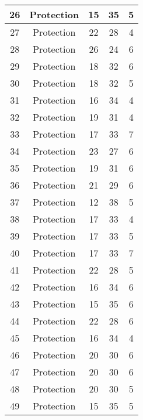 \documentclass[results.tex]{subfiles}
\begin{document}
\begin{center}
\begin{tabular}{| c || c | c | c | c |}
    \hline
    26 & Protection & 15 & 35 & 5 \\ 
    \hline
    27 & Protection & 22 & 28 & 4 \\ 
    \hline
    28 & Protection & 26 & 24 & 6 \\ 
    \hline
    29 & Protection & 18 & 32 & 6 \\ 
    \hline
    30 & Protection & 18 & 32 & 5 \\ 
    \hline
    31 & Protection & 16 & 34 & 4 \\ 
    \hline
    32 & Protection & 19 & 31 & 4 \\ 
    \hline
    33 & Protection & 17 & 33 & 7 \\ 
    \hline
    34 & Protection & 23 & 27 & 6 \\ 
    \hline
    35 & Protection & 19 & 31 & 6 \\ 
    \hline
    36 & Protection & 21 & 29 & 6 \\ 
    \hline
    37 & Protection & 12 & 38 & 5 \\ 
    \hline
    38 & Protection & 17 & 33 & 4 \\ 
    \hline
    39 & Protection & 17 & 33 & 5 \\ 
    \hline
    40 & Protection & 17 & 33 & 7 \\ 
    \hline
    41 & Protection & 22 & 28 & 5 \\ 
    \hline
    42 & Protection & 16 & 34 & 6 \\ 
    \hline
    43 & Protection & 15 & 35 & 6 \\ 
    \hline
    44 & Protection & 22 & 28 & 6 \\ 
    \hline
    45 & Protection & 16 & 34 & 4 \\ 
    \hline
    46 & Protection & 20 & 30 & 6 \\ 
    \hline
    47 & Protection & 20 & 30 & 6 \\ 
    \hline
    48 & Protection & 20 & 30 & 5 \\ 
    \hline
    49 & Protection & 15 & 35 & 5 \\ 
    \hline   \end{tabular}
\end{center}
\end{document}
